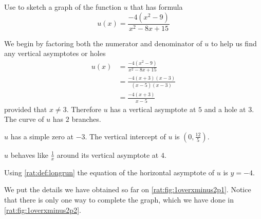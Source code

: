  \begin{pccexample}\label{rat:ex:asympandholep1}
	 Use  to sketch a graph of the function $u$
	 that has formula
	 \[
		 u(x)=\frac{-4(x^2-9)}{x^2-8x+15}
	 \]
	 \begin{pccsolution}
		 \begin{steps}
			 \item We begin by factoring both the numerator and denominator of $u$ to help
			 us find any vertical asymptotes or holes
			 \begin{align*}
				 u(x) & =\frac{-4(x^2-9)}{x^2-8x+15}     \\
				      & =\frac{-4(x+3)(x-3)}{(x-5)(x-3)} \\
				      & =\frac{-4(x+3)}{x-5}
			 \end{align*}
			 provided that $x\ne 3$. Therefore $u$ has a vertical asymptote at $5$ and
			 a hole at $3$. The curve of $u$ has $2$ branches.
			 \item $u$ has a simple zero at $-3$. The vertical intercept of $u$ is $\left( 0,\frac{12}{5} \right)$.
			 \item $u$ behaves like $\frac{1}{x}$ around its vertical asymptote at $4$.
			 \item Using \vref{rat:def:longrun} the equation of the horizontal asymptote of $u$ is $y=-4$.
			 \item We put the details we have obtained so far on \cref{rat:fig:1overxminus2p1}. Notice
			 that there is only one way to complete the graph, which we have done in \cref{rat:fig:1overxminus2p2}.
		 \end{steps}


\end{pccsolution}
\end{pccexample}
